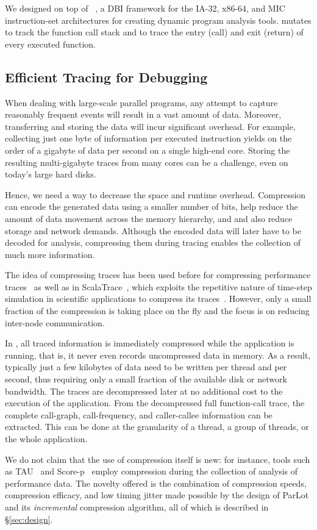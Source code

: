 We designed \parlot on top of \pin~\cite{pin}, a DBI framework for the IA-32, x86-64, and MIC instruction-set architectures for creating dynamic program analysis tools. \parlot mutates \pin to track the function call stack and to trace the entry (call) and exit (return) of every executed function.


\subsection{Efficient Tracing for Debugging}
When dealing with large-scale parallel programs, any attempt to capture reasonably frequent events will result in a vast amount of data. Moreover, transferring and storing the data will incur significant overhead. For example, collecting just one byte of information per executed instruction yields on the order of a gigabyte of data per second on a single high-end core. Storing the resulting multi-gigabyte traces from many cores can be a challenge, even on today's large hard disks.

Hence, we need a way to decrease the space and runtime overhead. Compression can encode the generated data using a smaller number of bits, help
reduce the amount of data movement across the memory hierarchy, and
and also reduce storage and network demands.
%
Although the encoded data will later have to be decoded for analysis, compressing them during tracing enables the collection of much more information.

The idea of compressing traces has been used before for compressing performance traces~\cite{eventflowgraph} as well as in ScalaTrace~\cite{scalatrace}, which exploits the repetitive nature of time-step simulation in scientific applications to compress its traces~\cite{freitag}. However, only a small fraction of the compression is taking place on the fly and the focus is on reducing inter-node communication. 

In \parlot, all traced information is immediately compressed while the application is running, that is, it never even records uncompressed data in memory. As a result, typically just a few kilobytes of data need to be written per thread and per second, thus requiring only a small fraction of the available disk or network bandwidth. The traces are decompressed later at no additional cost to the execution of the application. From the decompressed full function-call trace, the complete call-graph, call-frequency, and caller-callee information can be extracted. This can be done at the granularity of a thread, a group of threads, or the whole application.


We do not claim that the use of compression itself is new:
for instance, tools such as
TAU~\cite{tau} and Score-p~\cite{scorep}
employ compression during the collection
of analysis of performance data.
%
The novelty offered is the combination of compression
speeds, compression efficacy, and low timing jitter
made possible by the design of ParLot and its {\em incremental}
compression algorithm, all of which is
described in \S\ref{sec:design}.


